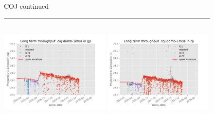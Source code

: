 \documentclass[]{spie}
\begin{document}
\begin{figure}\ContinuedFloat
\centering 
COJ continued \\ 
\rule{\textwidth}{0.4pt} \\

\includegraphics[width=0.49\textwidth]{images/photzptrend-coj-domb-1m0a-gp.png} \hspace*{\fill} 
\includegraphics[width=0.49\textwidth]{images/photzptrend-coj-domb-1m0a-rp.png} \\[1ex]


\end{figure}
\end{document}
